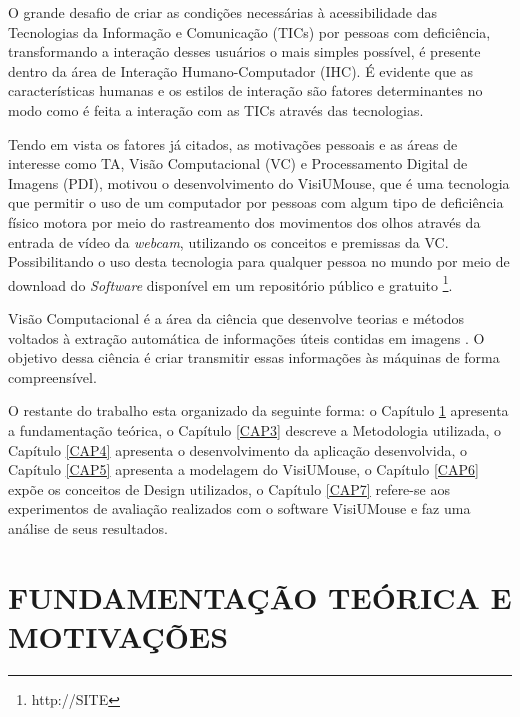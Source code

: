 O grande desafio de criar as condições necessárias à acessibilidade das Tecnologias da Informação e Comunicação (TICs) por pessoas com deficiência, transformando a interação desses usuários o mais simples possível, é presente dentro da área de Interação Humano-Computador (IHC). É evidente que as características humanas e os estilos de interação são fatores determinantes no modo como é feita a interação com as TICs através das tecnologias.

Tendo em vista os fatores já citados, as motivações pessoais e as áreas de interesse como TA, Visão Computacional (VC) e Processamento Digital de Imagens (PDI), motivou o desenvolvimento do VisiUMouse, que é  uma tecnologia que permitir o uso de um computador  por pessoas com algum tipo de deficiência físico motora por meio do rastreamento dos movimentos dos olhos através da entrada de vídeo da \textit{webcam}, utilizando os conceitos e premissas da VC. Possibilitando o uso desta tecnologia para qualquer pessoa no mundo por meio de download do \textit{Software} disponível em um repositório público e gratuito \footnote{http://SITE }.


Visão Computacional  é a área da ciência que desenvolve teorias e métodos voltados à extração automática de informações úteis contidas em imagens \cite{prince2012computer}. O objetivo dessa ciência é criar transmitir essas informações às máquinas de forma compreensível.


O restante do trabalho esta organizado da seguinte forma: o Capítulo \ref{CAP2} apresenta a fundamentação teórica, o Capítulo \ref{CAP3} descreve a Metodologia utilizada, o Capítulo \ref{CAP4} apresenta o desenvolvimento da aplicação desenvolvida, o Capítulo \ref{CAP5} apresenta a modelagem do VisiUMouse, o Capítulo \ref{CAP6} expõe os conceitos de Design utilizados, o Capítulo \ref{CAP7} refere-se aos experimentos de avaliação realizados com o software VisiUMouse e faz uma análise de seus resultados. 

\chapter{FUNDAMENTAÇÃO TEÓRICA E MOTIVAÇÕES}
\label{CAP2}

